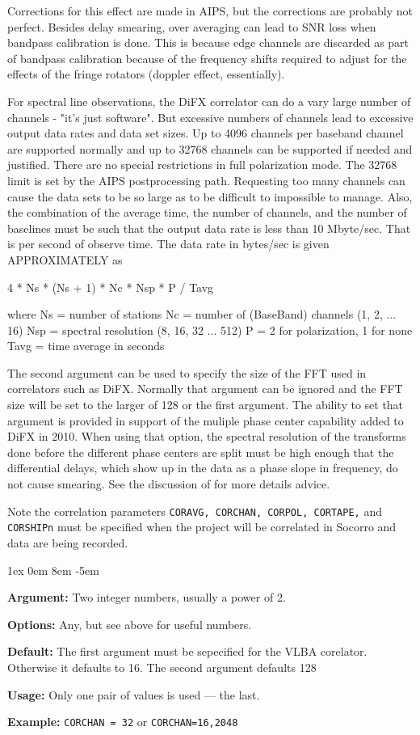 \documentclass{report}
\newcommand{\rcwbox}[5]{
  \begin{list}{}{\parsep 1ex  \itemsep 0em
                 \leftmargin 8em  \itemindent -5em }
    \item {\bf Argument:} #1
    \item {\bf Options:}  #2
    \item {\bf Default:}  #3
    \item {\bf Usage:}    #4
    \item {\bf Example:}  #5
  \end{list}
}
\begin{document}
Corrections for this effect are made in AIPS, but the corrections are
probably not perfect.  Besides delay smearing, over averaging can lead
to SNR loss when bandpass calibration is done.  This is because edge
channels are discarded as part of bandpass calibration because of the
frequency shifts required to adjust for the effects of the fringe
rotators (doppler effect, essentially).

For spectral line observations, the DiFX correlator can do a vary large
number of channels - "it's just software".  But excessive numbers
of channels lead to excessive output data rates and data set sizes.
Up to 4096 channels per baseband channel are supported normally and
up to 32768 channels can be supported if needed and justified.  There
are no special restrictions in full polarization mode.  The 32768 limit
is set by the AIPS postprocessing path.  Requesting too
many channels can cause the data sets to be so large as to be
difficult to impossible to manage.  Also, the combination of the
average time, the number of channels, and the number of baselines must
be such that the output data rate is less than 10 Mbyte/sec.  That is
per second of observe time.  The
data rate in bytes/sec is given APPROXIMATELY as

    4 * Ns * (Ns + 1) * Nc * Nsp * P / Tavg

 where Ns   = number of stations
       Nc   = number of (BaseBand) channels (1, 2, ... 16)
       Nsp  = spectral resolution (8, 16, 32 ... 512)
       P    = 2 for polarization, 1 for none
       Tavg = time average in seconds

The second argument can be used to specify the size of the FFT used in
correlators such as DiFX.  Normally that argument can be ignored and
the FFT size will be set to the larger of 128 or the first argument.
The ability to set that argument is provided in support of the muliple
phase center capability added to DiFX in 2010.  When using that
option, the spectral resolution of the transforms done before the
different phase centers are split must be high enough that the
differential delays, which show up in the data as a phase slope in
frequency, do not cause smearing.  See the discussion of
 for
more details advice.

Note the correlation parameters {\tt CORAVG, CORCHAN,
CORPOL, CORTAPE,} and {\tt CORSHIPn} must be specified when
the project will be correlated in Socorro and data
are being recorded.

\rcwbox
{Two integer numbers, usually a power of 2.}
{Any, but see above for useful numbers.}
{The first argument must be sepecified for the VLBA corelator.
Otherwise it defaults to 16.  The second argument defaults 128}
{Only one pair of values is used --- the last.}
{{\tt CORCHAN = 32} or {\tt CORCHAN=16,2048}}
\end{document}
